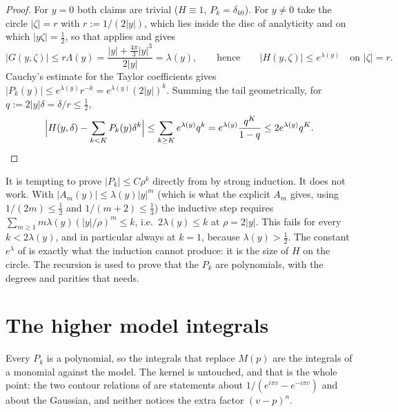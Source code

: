 \begin{proof}
For $y=0$ both claims are trivial ($H\equiv1$, $P_{k}=\delta_{k0}$).  For $y\ne0$ take the
circle $\lvert\zeta\rvert=r$ with $r:=1/(2\lvert y\rvert)$, which lies inside the disc of
analyticity and on which $\lvert y\zeta\rvert=\tfrac12$, so that  applies
and gives
\[
  \lvert G(y,\zeta)\rvert\le r\Lambda(y)=\frac{\lvert y\rvert+\tfrac{4\pi}3\lvert y\rvert^{3}}
  {2\lvert y\rvert}=\lambda(y),\qquad\text{hence}\qquad\lvert H(y,\zeta)\rvert\le e^{\lambda(y)}
  \quad\text{on }\lvert\zeta\rvert=r .
\]
Cauchy's estimate for the Taylor coefficients gives $\lvert P_{k}(y)\rvert\le
e^{\lambda(y)}r^{-k}=e^{\lambda(y)}(2\lvert y\rvert)^{k}$.  Summing the tail geometrically, for
$q:=2\lvert y\rvert\delta=\delta/r\le\tfrac12$,
\[
  \Bigl\lvert H(y,\delta)-\sum_{k<K}P_{k}(y)\delta^{k}\Bigr\rvert
  \le\sum_{k\ge K}e^{\lambda(y)}q^{k}=e^{\lambda(y)}\frac{q^{K}}{1-q}\le2e^{\lambda(y)}q^{K}. \qedhere
\]
\end{proof}

\begin{remark}
\label{rem:rsg_why_cauchy}
It is tempting to prove $\lvert P_{k}\rvert\le C\rho^{k}$ directly from
 by strong induction.  It does not work.  With
$\lvert A_{m}(y)\rvert\le\lambda(y)\lvert y\rvert^{m}$ (which is what the explicit $A_{m}$
gives, using $1/(2m)\le\tfrac12$ and $1/(m+2)\le\tfrac13$) the inductive step requires
$\sum_{m\ge1}m\lambda(y)(\lvert y\rvert/\rho)^{m}\le k$, i.e.\ $2\lambda(y)\le k$ at
$\rho=2\lvert y\rvert$.  This fails for every $k<2\lambda(y)$, and in particular always at
$k=1$, because $\lambda(y)>\tfrac12$.  The constant $e^{\lambda}$ of  is
exactly what the induction cannot produce: it is the size of $H$ on the circle.  The recursion
is used to prove that the $P_{k}$ are polynomials, with the degrees and parities that
 needs.
\end{remark}

\section{The higher model integrals}
\label{sec:rsg_model}

Every $P_{k}$ is a polynomial, so the integrals that replace $M(p)$ are the integrals of a
monomial against the model.  The kernel is untouched, and that is the whole point: the two
contour relations of  are statements about $1/(e^{i\pi v}-e^{-i\pi v})$ and
about the Gaussian, and neither notices the extra factor $(v-p)^{n}$.

